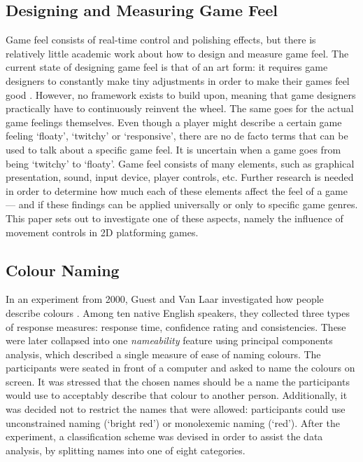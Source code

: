 
\subsection{Designing and Measuring Game Feel}
Game feel consists of real-time control and polishing effects, but there is relatively little academic work about how to design and measure game feel. The current state of designing game feel is that of an art form: it requires game designers to constantly make tiny adjustments in order to make their games feel good \cite{meatboy1, meatboy2, juicyBeast, gameFeelTips}. However, no framework exists to build upon, meaning that game designers practically have to continuously reinvent the wheel. The same goes for the actual game feelings themselves. Even though a player might describe a certain game feeling `floaty', `twitchy' or `responsive', there are no de facto terms that can be used to talk about a specific game feel. It is uncertain when a game goes from being `twitchy' to `floaty'. Game feel consists of many elements, such as graphical presentation, sound, input device, player controls, etc. Further research is needed in order to determine how much each of these elements affect the feel of a game --- and if these findings can be applied universally or only to specific game genres. This paper sets out to investigate one of these aspects, namely the influence of movement controls in 2D platforming games.

\subsection{Colour Naming}
In an experiment from 2000, Guest and Van Laar investigated how people describe colours \cite{guest_structure_2000}. Among ten native English speakers, they collected three types of response measures: response time, confidence rating and consistencies. These were later collapsed into one \textit{nameability} feature using principal components analysis, which described a single measure of ease of naming colours. The participants were seated in front of a computer and asked to name the colours on screen. It was stressed that the chosen names should be a name the participants would use to acceptably describe that colour to another person. Additionally, it was decided not to restrict the names that were allowed: participants could use unconstrained naming (`bright red') or monolexemic naming (`red'). After the experiment, a classification scheme was devised in order to assist the data analysis, by splitting names into one of eight categories.

